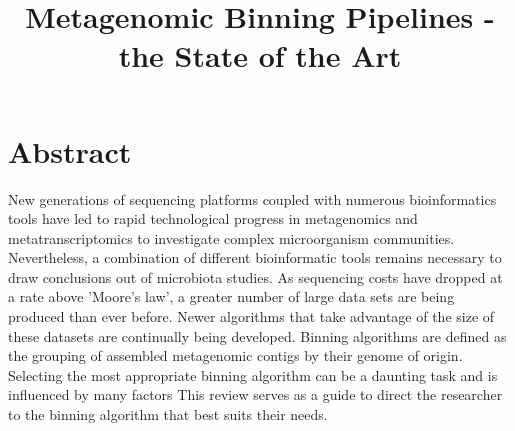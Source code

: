 \documentclass{article}
\title{Metagenomic Binning Pipelines - the State of the Art}
\date{}
\begin{document}
\maketitle

\section*{Abstract}
New generations of sequencing platforms coupled with numerous bioinformatics tools have led to rapid technological progress in metagenomics and metatranscriptomics to investigate complex microorganism communities.
Nevertheless, a combination of different bioinformatic tools remains necessary to draw conclusions out of microbiota studies.
As sequencing costs have dropped at a rate above 'Moore's law', a greater number of large data sets are being produced than ever before.
Newer algorithms that take advantage of the size of these datasets are continually being developed.
Binning algorithms are defined as the grouping of assembled metagenomic contigs by their genome of origin.
Selecting the most appropriate binning algorithm can be a daunting task and is influenced by many factors 
This review serves as a guide to direct the researcher to the binning algorithm that best suits their needs.
\end{document}
